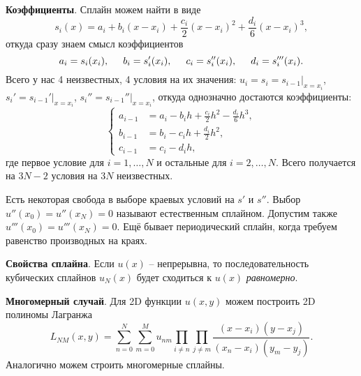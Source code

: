\textbf{Коэффициенты}.
Сплайн можем найти в виде
\begin{equation*}
	s_i (x) = a_i + b_i (x-x_i) + \frac{c_i}{2} (x-x_i)^2 + \frac{d_i}{6} (x-x_i)^3,
\end{equation*}
откуда сразу знаем смысл коэффициентов
\begin{equation*}
	a_i = s_i(x_i),
	\hspace{5 mm} 
	b_i = s_i' (x_i), 
	\hspace{5 mm} 
	c_i = s_i''(x_i),
	\hspace{5 mm} 
	d_i = s_i'''(x_i).
\end{equation*}
Всего у нас 4 неизвестных, 4 условия на их значения: $u_i = s_i=s_{i-1}|_{x=x_i}$, $s_i'=s_{i-1}'|_{x=x_i}$, $s_i''=s_{i-1}''|_{x=x_i}$, откуда однозначно достаются коэффициенты:
\begin{equation*}
	\left\{\begin{aligned}
	    a_{i-1} &= a_i - b_i h  + \tfrac{c_i}{2} h^2 - \tfrac{d_i}{6} h^3, \\
	    b_{i-1} &= b_i - c_i h + \tfrac{d_i}{2} h^2, \\
		c_{i-1}	&= c_i - d_i h,
	\end{aligned}\right.
\end{equation*}
где первое условие для $i=1,\ldots,N$ и остальные для $i=2, \ldots, N$. 
Всего получается на $3 N-2$ условия на $3 N$ неизвестных. 

Есть некоторая свобода в выборе краевых условий на $s'$ и $s''$. Выбор $u''(x_0) = u''(x_N) = 0$ называют естественным сплайном. Допустим также $u'''(x_0) = u'''(x_N) = 0$. Ещё бывает периодический сплайн, когда требуем равенство производных на краях. 

\textbf{Свойства сплайна}. Если $u(x)$ -- непрерывна, то последовательность кубических сплайнов $u_N (x)$ будет сходиться к $u(x)$ \textit{равномерно}. 


\textbf{Многомерный случай}. Для 2D функции $u(x, y)$ можем построить 2D полиномы Лагранжа
\begin{equation*}
	L_{NM} (x, y) = \sum_{n=0}^{N} \sum_{m=0}^{M} u_{nm} \prod_{i \neq n} \prod_{j \neq m} \frac{(x-x_i) (y-x_j)}{(x_n -x_i)(y_m-y_j)}.
\end{equation*}
Аналогично можем строить многомерные сплайны. 


